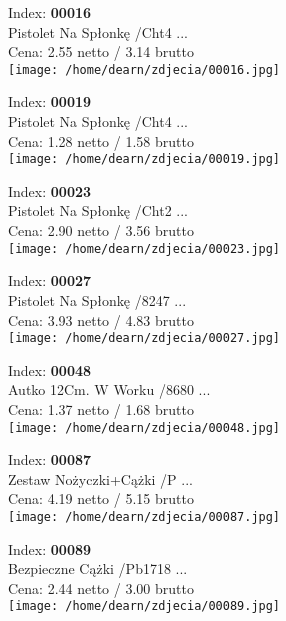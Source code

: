 {Index: \textbf{00016}\\
Pistolet Na Spłonkę /Cht4 ...\\
Cena: 2.55 netto / 3.14 brutto\\
  \texttt{[image: /home/dearn/zdjecia/00016.jpg]}}\newline\newline

{Index: \textbf{00019}\\
Pistolet Na Spłonkę /Cht4 ...\\
Cena: 1.28 netto / 1.58 brutto\\
  \texttt{[image: /home/dearn/zdjecia/00019.jpg]}}\newline\newline

{Index: \textbf{00023}\\
Pistolet Na Spłonkę /Cht2 ...\\
Cena: 2.90 netto / 3.56 brutto\\
  \texttt{[image: /home/dearn/zdjecia/00023.jpg]}}\newline\newline

{Index: \textbf{00027}\\
Pistolet Na Spłonkę /8247 ...\\
Cena: 3.93 netto / 4.83 brutto\\
  \texttt{[image: /home/dearn/zdjecia/00027.jpg]}}\newline\newline

{Index: \textbf{00048}\\
Autko 12Cm. W Worku /8680 ...\\
Cena: 1.37 netto / 1.68 brutto\\
  \texttt{[image: /home/dearn/zdjecia/00048.jpg]}}\newline\newline

{Index: \textbf{00087}\\
Zestaw Nożyczki+Cążki  /P ...\\
Cena: 4.19 netto / 5.15 brutto\\
  \texttt{[image: /home/dearn/zdjecia/00087.jpg]}}\newline\newline

{Index: \textbf{00089}\\
Bezpieczne Cążki  /Pb1718 ...\\
Cena: 2.44 netto / 3.00 brutto\\
  \texttt{[image: /home/dearn/zdjecia/00089.jpg]}}\newline\newline

